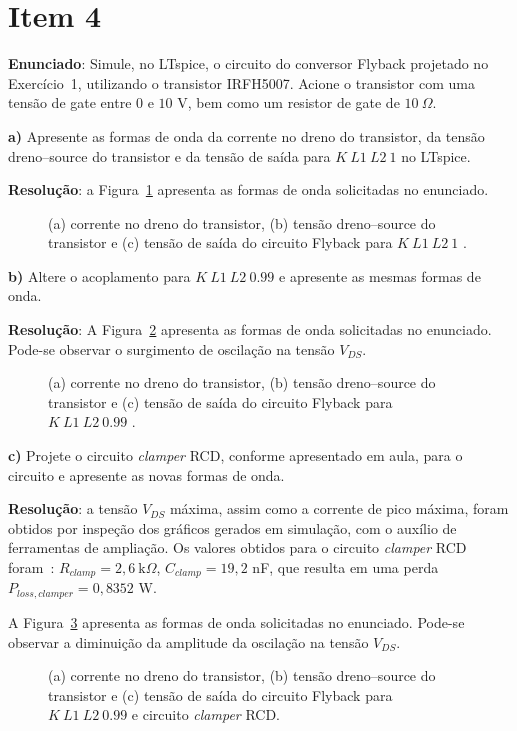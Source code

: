\section*{Item 4}\label{it:4}

\textbf{Enunciado}: Simule, no LTspice, o circuito do conversor Flyback projetado no Exercício~1, utilizando o transistor IRFH5007. Acione o transistor com uma tensão de gate entre $0$ e $10$ V, bem como um resistor de gate de $10~\Omega$.

\medskip
\textbf{a)} Apresente as formas de onda da corrente no dreno do transistor, da tensão dreno--source do transistor e da tensão de saída para $K~L1~L2~1$ no LTspice.

\medskip
\textbf{Resolução}:
a Figura~\ref{fig:ex4_1} apresenta as formas de onda solicitadas no enunciado.
\begin{figure}[htb!]
	\centering
	
	\caption{(a) corrente no dreno do transistor, (b) tensão dreno--source do transistor e (c) tensão de saída do circuito Flyback para $K~L1~L2~1$ .}
	\label{fig:ex4_1}
\end{figure}

\medskip
\textbf{b)} Altere o acoplamento para $K~L1~L2~0.99$ e apresente as mesmas formas de onda.

\medskip
\textbf{Resolução}:
A Figura~\ref{fig:ex4_2} apresenta as formas de onda solicitadas no enunciado. Pode-se observar o surgimento de oscilação na tensão $V_{DS}$.
\begin{figure}[htb!]
	\centering
	
	\caption{(a) corrente no dreno do transistor, (b) tensão dreno--source do transistor e (c) tensão de saída do circuito Flyback para $K~L1~L2~0.99$ .}
	\label{fig:ex4_2}
\end{figure}

\medskip
\textbf{c)} Projete o circuito \textit{clamper} RCD, conforme apresentado em aula, para o circuito e apresente as novas formas de onda.

\medskip
\textbf{Resolução}: a tensão $V_{DS}$ máxima, assim como a corrente de pico máxima, foram obtidos por inspeção dos gráficos gerados em simulação, com o auxílio de ferramentas de ampliação. Os valores obtidos para o circuito \textit{clamper} RCD foram~\cite{aula6_isolados}: $R_{clamp} = 2{,}6~\text{k}\Omega$, $C_{clamp} = 19{,}2$ nF, que resulta em uma perda $P_{loss,clamper} = 0{,}8352$ W.

A Figura~\ref{fig:ex4_3} apresenta as formas de onda solicitadas no enunciado. Pode-se observar a diminuição da amplitude da oscilação na tensão $V_{DS}$.
\begin{figure}[htb!]
	\centering
	
	\caption{(a) corrente no dreno do transistor, (b) tensão dreno--source do transistor e (c) tensão de saída do circuito Flyback para $K~L1~L2~0.99$ e circuito \textit{clamper} RCD.}
	\label{fig:ex4_3}
\end{figure}

